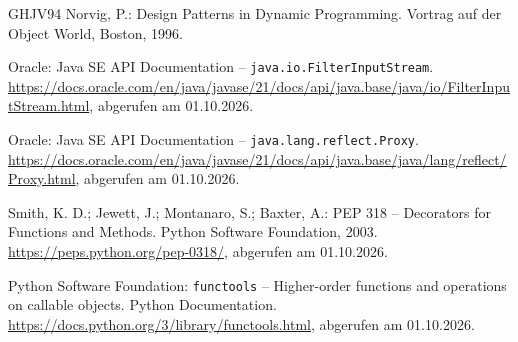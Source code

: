 \documentclass[a4paper,11pt,toc=listof,toc=bibliography]{scrartcl}
\begin{document}
\begin{thebibliography}{GHJV94}
Norvig, P.: Design Patterns in Dynamic Programming. Vortrag auf der Object World, Boston, 1996.

Oracle: Java SE API Documentation -- \texttt{java.io.FilterInputStream}. \url{https://docs.oracle.com/en/java/javase/21/docs/api/java.base/java/io/FilterInputStream.html}, abgerufen am 01.10.2026.

Oracle: Java SE API Documentation -- \texttt{java.lang.reflect.Proxy}. \url{https://docs.oracle.com/en/java/javase/21/docs/api/java.base/java/lang/reflect/Proxy.html}, abgerufen am 01.10.2026.

Smith, K. D.; Jewett, J.; Montanaro, S.; Baxter, A.: PEP 318 -- Decorators for Functions and Methods. Python Software Foundation, 2003. \url{https://peps.python.org/pep-0318/}, abgerufen am 01.10.2026.

Python Software Foundation: \texttt{functools} -- Higher-order functions and operations on callable objects. Python Documentation. \url{https://docs.python.org/3/library/functools.html}, abgerufen am 01.10.2026.

\end{thebibliography}
\end{document}
